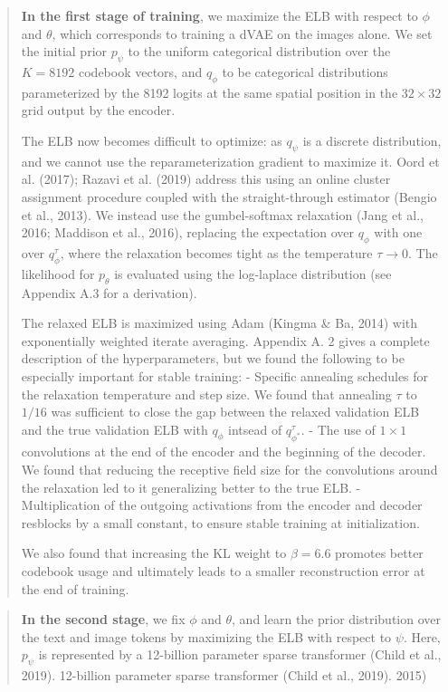 \documentclass{article}
\begin{document}
\begin{appendix}
\blockquote{\textbf{In the first stage of training}, we maximize the ELB with respect to $\phi$ and $\theta$, which corresponds to training a dVAE on the images alone. We set the initial prior $p_{\psi}$ to the uniform categorical distribution over the $K=8192$ codebook vectors, and $q_{\phi}$ to be categorical distributions parameterized by the 8192 logits at the same spatial position in the $32 \times 32$ grid output by the encoder.

The ELB now becomes difficult to optimize: as $q_{\psi}$ is a discrete distribution, and we cannot use the reparameterization gradient to maximize it. Oord et al. (2017); Razavi et al. (2019) address this using an online cluster assignment procedure coupled with the straight-through estimator (Bengio et al., 2013). We instead use the gumbel-softmax relaxation (Jang et al., 2016; Maddison et al., 2016), replacing the expectation over $q_{\phi}$ with one over $q_{\phi}^{\tau}$, where the relaxation becomes tight as the temperature $\tau \rightarrow 0$. The likelihood for $p_{\theta}$ is evaluated using the log-laplace distribution (see Appendix A.3 for a derivation).

The relaxed ELB is maximized using Adam (Kingma \& Ba, 2014) with exponentially weighted iterate averaging. Appendix A. 2 gives a complete description of the hyperparameters, but we found the following to be especially important for stable training:
- Specific annealing schedules for the relaxation temperature and step size. We found that annealing $\tau$ to $1 / 16$ was sufficient to close the gap between the relaxed validation ELB and the true validation ELB with $q_{\phi}$ intsead of $q_{\phi^{*}}^{\tau}$.
- The use of $1 \times 1$ convolutions at the end of the encoder and the beginning of the decoder. We found that reducing the receptive field size for the convolutions around the relaxation led to it generalizing better to the true ELB.
- Multiplication of the outgoing activations from the encoder and decoder resblocks by a small constant, to ensure stable training at initialization.

We also found that increasing the KL weight to $\beta=6.6$ promotes better codebook usage and ultimately leads to a smaller reconstruction error at the end of training.
}

\blockquote{
\textbf{In the second stage}, we fix $\phi$ and $\theta$, and learn the prior distribution over the text and image tokens by maximizing the ELB with respect to $\psi$.
Here, $p_{\psi}$ is represented by a 12-billion parameter sparse transformer (Child et al., 2019).
12-billion parameter sparse transformer (Child et al., 2019). 2015)

}
\end{appendix}
\end{document}
